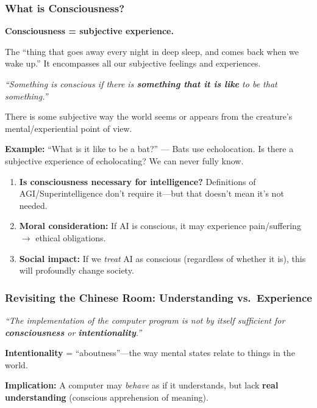\bigseparator

\subsubsection{What is Consciousness?}

\begin{defbox}
\textbf{Consciousness = subjective experience.}

The ``thing that goes away every night in deep sleep, and comes back when we wake up.'' It encompasses all our subjective feelings and experiences.
\end{defbox}

\begin{defbox}
\textit{``Something is conscious if there is \textbf{something that it is like} to be that something.''}

There is some subjective way the world seems or appears from the creature's mental/experiential point of view.

\textbf{Example:} ``What is it like to be a bat?'' --- Bats use echolocation. Is there a subjective experience of echolocating? We can never fully know.
\end{defbox}

\begin{tipbox}
\begin{enumerate}
  \item \textbf{Is consciousness necessary for intelligence?} Definitions of AGI/Superintelligence don't require it---but that doesn't mean it's not needed.
  \item \textbf{Moral consideration:} If AI is conscious, it may experience pain/suffering $\to$ ethical obligations.
  \item \textbf{Social impact:} If we \textit{treat} AI as conscious (regardless of whether it is), this will profoundly change society.
\end{enumerate}
\end{tipbox}

\bigseparator

\subsubsection{Revisiting the Chinese Room: Understanding vs.\ Experience}

\begin{thmbox}
\textit{``The implementation of the computer program is not by itself sufficient for \textbf{consciousness} or \textbf{intentionality}.''}

\textbf{Intentionality} = ``aboutness''---the way mental states relate to things in the world.

\textbf{Implication:} A computer may \textit{behave} as if it understands, but lack \textbf{real understanding} (conscious apprehension of meaning).
\end{thmbox}

